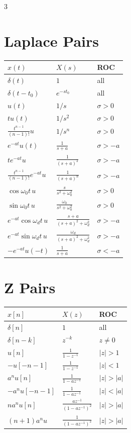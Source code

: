 \documentclass[11pt]{extarticle}
\begin{document}
\begin{paracol}{3}

\section*{Laplace Pairs}
\begin{tabular}{@{}l l l@{}}
\toprule
$x(t)$ & $X(s)$ & ROC \\
\midrule
$\delta(t)$ & $1$ & all \\
$\delta(t{-}t_0)$ & $e^{-st_0}$ & all \\
$u(t)$ & $1/s$ & $\sigma{>}0$ \\
$tu(t)$ & $1/s^2$ & $\sigma{>}0$ \\
$\tfrac{t^{n-1}}{(n-1)!}u$ & $1/s^n$ & $\sigma{>}0$ \\
$e^{-at}u(t)$ & $\tfrac{1}{s{+}a}$ & $\sigma{>}{-}a$ \\
$te^{-at}u$ & $\tfrac{1}{(s{+}a)^2}$ & $\sigma{>}{-}a$ \\
$\tfrac{t^{n-1}}{(n-1)!}e^{-at}u$ & $\tfrac{1}{(s{+}a)^n}$ & $\sigma{>}{-}a$ \\
$\cos\omega_0 t\,u$ & $\tfrac{s}{s^2{+}\omega_0^2}$ & $\sigma{>}0$ \\
$\sin\omega_0 t\,u$ & $\tfrac{\omega_0}{s^2{+}\omega_0^2}$ & $\sigma{>}0$ \\
$e^{-at}\!\cos\omega_d t\,u$ & $\tfrac{s{+}a}{(s{+}a)^2{+}\omega_d^2}$ & $\sigma{>}{-}a$ \\
$e^{-at}\!\sin\omega_d t\,u$ & $\tfrac{\omega_d}{(s{+}a)^2{+}\omega_d^2}$ & $\sigma{>}{-}a$ \\
$-e^{-at}u(-t)$ & $\tfrac{1}{s{+}a}$ & $\sigma{<}{-}a$ \\
\bottomrule
\end{tabular}

\vspace{6pt}
\section*{Z Pairs}
\begin{tabular}{@{}l l l@{}}
\toprule
$x[n]$ & $X(z)$ & ROC \\
\midrule
$\delta[n]$ & $1$ & all \\
$\delta[n{-}k]$ & $z^{-k}$ & $z{\ne}0$ \\
$u[n]$ & $\tfrac{1}{1-z^{-1}}$ & $|z|{>}1$ \\
$-u[-n{-}1]$ & $\tfrac{1}{1-z^{-1}}$ & $|z|{<}1$ \\
$a^n u[n]$ & $\tfrac{1}{1-az^{-1}}$ & $|z|{>}|a|$ \\
$-a^n u[-n{-}1]$ & $\tfrac{1}{1-az^{-1}}$ & $|z|{<}|a|$ \\
$na^n u[n]$ & $\tfrac{az^{-1}}{(1-az^{-1})^2}$ & $|z|{>}|a|$ \\
$(n{+}1)a^n u$ & $\tfrac{1}{(1-az^{-1})^2}$ & $|z|{>}|a|$ \\
\bottomrule
\end{tabular}


\end{paracol}
\end{document}
